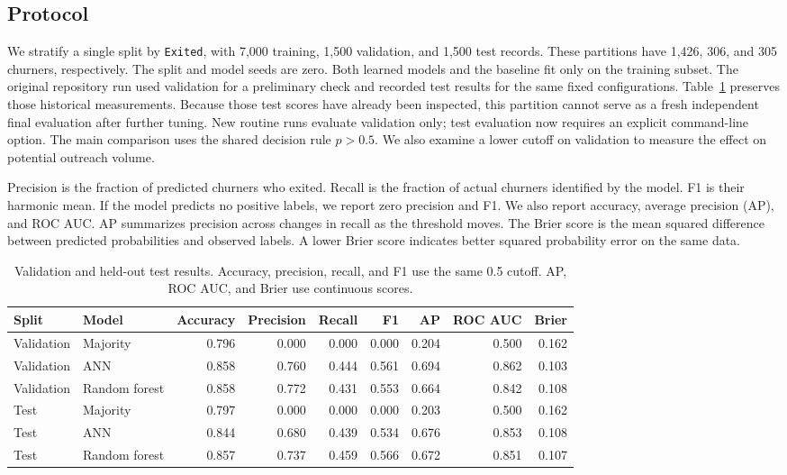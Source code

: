 \documentclass[11pt]{article}
\begin{document}
\subsection{Protocol}

We stratify a single split by \texttt{Exited}, with 7,000 training, 1,500 validation, and 1,500 test records. These partitions have 1,426, 306, and 305 churners, respectively. The split and model seeds are zero. Both learned models and the baseline fit only on the training subset. The original repository run used validation for a preliminary check and recorded test results for the same fixed configurations. Table~\ref{tab:metrics} preserves those historical measurements. Because those test scores have already been inspected, this partition cannot serve as a fresh independent final evaluation after further tuning. New routine runs evaluate validation only; test evaluation now requires an explicit command-line option. The main comparison uses the shared decision rule $p>0.5$. We also examine a lower cutoff on validation to measure the effect on potential outreach volume.

Precision is the fraction of predicted churners who exited. Recall is the fraction of actual churners identified by the model. F1 is their harmonic mean. If the model predicts no positive labels, we report zero precision and F1. We also report accuracy, average precision (AP), and ROC AUC. AP summarizes precision across changes in recall as the threshold moves. The Brier score is the mean squared difference between predicted probabilities and observed labels. A lower Brier score indicates better squared probability error on the same data.

\begin{table}[t]
  \centering
  \small
  \setlength{\tabcolsep}{7pt}
  \begin{tabular}{llrrrrrrr}
    \hline
    Split & Model & Accuracy & Precision & Recall & F1 & AP & ROC AUC & Brier \\
    \hline
    Validation & Majority & 0.796 & 0.000 & 0.000 & 0.000 & 0.204 & 0.500 & 0.162 \\
    Validation & ANN & 0.858 & 0.760 & 0.444 & 0.561 & 0.694 & 0.862 & 0.103 \\
    Validation & Random forest & 0.858 & 0.772 & 0.431 & 0.553 & 0.664 & 0.842 & 0.108 \\
    \hline
    Test & Majority & 0.797 & 0.000 & 0.000 & 0.000 & 0.203 & 0.500 & 0.162 \\
    Test & ANN & 0.844 & 0.680 & 0.439 & 0.534 & 0.676 & 0.853 & 0.108 \\
    Test & Random forest & 0.857 & 0.737 & 0.459 & 0.566 & 0.672 & 0.851 & 0.107 \\
    \hline
  \end{tabular}
  \caption{Validation and held-out test results. Accuracy, precision, recall, and F1 use the same 0.5 cutoff. AP, ROC AUC, and Brier use continuous scores.}
  \label{tab:metrics}
\end{table}
\end{document}
